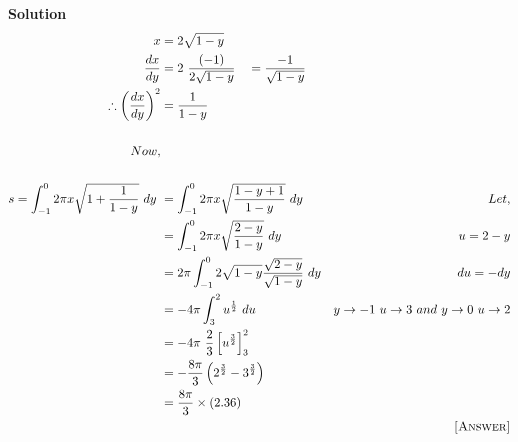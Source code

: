 \documentclass[12pt]{article}
\begin{document}
\textbf{Solution}
\begin{align*}
    x&=2\sqrt{1-y}\\
    \frac{dx}{dy}&=2\ \frac{(-1)}{2\sqrt{1-y}}\quad =\frac{-1}{\sqrt{1-y}}\\
    \therefore\left(\frac{dx}{dy}\right)^2&=\frac{1}{1-y}\\\\
    Now,\\\\ s=\int_{-1}^{0}2\pi x\sqrt{1+\frac{1}{1-y}}\ dy\ 
    &=\int_{-1}^{0}2\pi x\sqrt{\frac{1-y+1}{1-y}}\ dy &  Let,\\
    &=\int_{-1}^{0}2\pi x\sqrt{\frac{2-y}{1-y}}\ dy & u=2-y\\
    &=2\pi\int_{-1}^{0}2\sqrt{1-y}\frac{\sqrt{2-y}}{\sqrt{1-y}}\ dy & du=-dy\\
    &=-4\pi\int_{3}^{2}u^{\frac{1}{2}}\ du & y\rightarrow-1\ u\rightarrow3\ and\ y\rightarrow0\ u\rightarrow2\\
    &=-4\pi\ \frac{2}{3}\left[u^{\frac{3}{2}}\right]_{3}^{2}\\
    &=-\frac{8\pi}{3}\left(2^{\frac{3}{2}}-3^{\frac{3}{2}}\right)\\
    &=\frac{8\pi}{3}\times(2.36)\\
    & & \textsc{[Answer]}
\end{align*}
\end{document}
